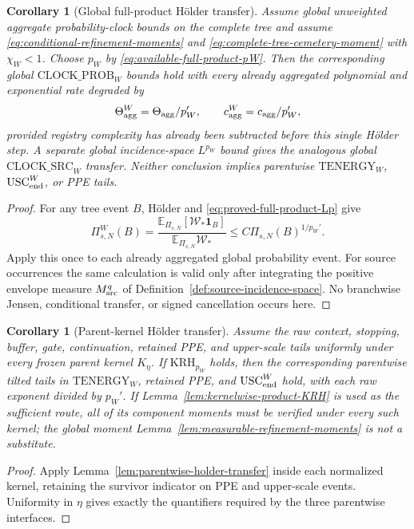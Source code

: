 \documentclass[11pt]{article}
\newtheorem{corollary}[theorem]{Corollary}
\newcommand{\one}{\mathbf 1}
\begin{document}
\begin{corollary}[Global full-product H\"older transfer]
\label{cor:full-product-holder-energy}
Assume global unweighted aggregate probability-clock bounds on the complete
tree and assume
\eqref{eq:conditional-refinement-moments} and
\eqref{eq:complete-tree-cemetery-moment} with $\chi_W<1$.  Choose $p_W$ by
\eqref{eq:available-full-product-pW}.  Then the corresponding global
\(\mathrm{CLOCK\_PROB}_{W}\) bounds hold with every already aggregated
polynomial and exponential rate degraded by
\[
 \Theta_{\rm agg}^{W}=\Theta_{\rm agg}/p_W',\qquad
 c_{\rm agg}^{W}=c_{\rm agg}/p_W',
\]
provided registry complexity has already been subtracted before this single
H\"older step.  A separate global incidence-space $L^{p_W}$ bound gives the
analogous global \(\mathrm{CLOCK\_SRC}_{W}\) transfer.  Neither conclusion
implies parentwise \(\mathrm{TENERGY}_{W}\), \(\mathrm{USC}_{\rm end}^{W}\),
or PPE tails.
\end{corollary}

\begin{proof}
For any tree event $B$, H\"older and
\eqref{eq:proved-full-product-Lp} give
\[
 \Pi_{s,N}^{W}(B)
 =\frac{\mathbb E_{\Pi_{s,N}}[\mathscr W_*\one_B]}
        {\mathbb E_{\Pi_{s,N}}\mathscr W_*}
 \le C\Pi_{s,N}(B)^{1/p_W'}.
\]
Apply this once to each already aggregated global probability event.  For
source occurrences the same calculation is valid only after integrating
the positive envelope measure $M_{\rm src}^{q}$ of
Definition~\ref{def:source-incidence-space}.  No branchwise Jensen,
conditional transfer, or signed cancellation occurs here.
\end{proof}

\begin{corollary}[Parent-kernel H\"older transfer]
\label{cor:parent-kernel-holder-energy}
Assume the raw context, stopping, buffer, gate, continuation, retained PPE,
and upper-scale tails uniformly under every frozen parent kernel $K_\eta$.
If \(\mathrm{KRH}_{p_W}\) holds, then the corresponding parentwise tilted
tails in \(\mathrm{TENERGY}_{W}\), retained PPE, and
\(\mathrm{USC}_{\rm end}^{W}\) hold, with each raw exponent divided by
$p_W'$.  If Lemma~\ref{lem:kernelwise-product-KRH} is used as the sufficient
route, all of its component moments must be verified under every such
kernel; the global moment Lemma~\ref{lem:measurable-refinement-moments} is
not a substitute.
\end{corollary}

\begin{proof}
Apply Lemma~\ref{lem:parentwise-holder-transfer} inside each normalized
kernel, retaining the survivor indicator on PPE and upper-scale events.
Uniformity in $\eta$ gives exactly the quantifiers required by the three
parentwise interfaces.
\end{proof}
\end{document}
